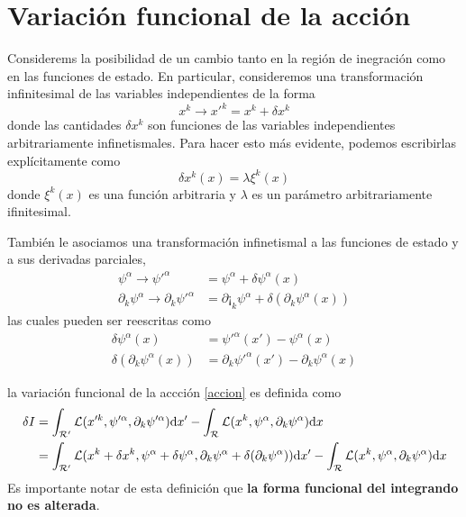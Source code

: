 \section{Variación funcional de la acción}
Considerems la posibilidad de un cambio tanto en la región de inegración como en las funciones de estado. En particular, consideremos una transformación infinitesimal de las variables independientes de la forma
\begin{equation}\label{3a}
  x^k\to x'^k=x^k+\delta x^k
\end{equation}
donde las cantidades $\delta x^k$ son funciones de las variables independientes arbitrariamente infinetismales. Para hacer esto más evidente, podemos escribirlas explícitamente como
\begin{equation}
  \delta x^k(x)=\lambda\xi^k(x)
\end{equation}
donde $\xi^k(x)$ es una función arbitraria y $\lambda$ es un parámetro arbitrariamente ifinitesimal.

También le asociamos una transformación infinetismal a las funciones de estado y a sus derivadas parciales,
\begin{align}
  \psi^\alpha \to \psi'^\alpha&=\psi^\alpha+\delta \psi^\alpha(x)\\
  \partial_k\psi^\alpha \to \partial_k\psi'^\alpha&=\partial¡_k\psi^\alpha+\delta (\partial_k\psi^\alpha(x))
\end{align}
las cuales pueden ser reescritas como
\begin{equation}\label{3b}
\begin{split}
  \delta \psi^\alpha(x) &=\psi'^\alpha(x')-\psi^\alpha(x)\\
  \delta (\partial_k\psi^\alpha(x)) &=\partial_k\psi'^\alpha(x')-\partial_k\psi^\alpha(x)
 \end{split}
\end{equation}

la variación funcional de la accción \eqref{accion} es definida como
\begin{align}
  \delta I&=\int_\mathcal{R'}\mathcal{L}(x'^k,\psi'^\alpha,\partial_k\psi'^\alpha)\dd x'-\int_\mathcal{R}\mathcal{L}(x^k,\psi^\alpha,\partial_k\psi^\alpha) \dd x\\
  &=\int_\mathcal{R'}\mathcal{L} (x^k+\delta x^k,\psi^\alpha+\delta\psi^\alpha,\partial_k\psi^\alpha+\delta(\partial_k\psi^\alpha))\dd x'-\int_\mathcal{R}\mathcal{L}(x^k,\psi^\alpha,\partial_k\psi^\alpha)\dd x \label{4}
\end{align}
Es importante notar de esta definición que \textbf{la forma funcional del integrando no es alterada}.

